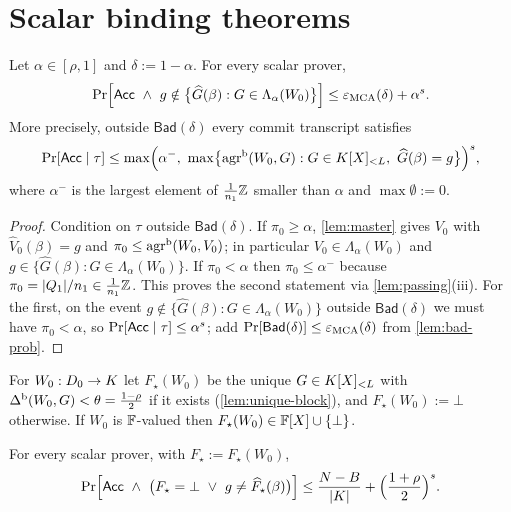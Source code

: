 \section{Scalar binding theorems}

\begin{theorem}\label{thm:scalar-list}
Let $\alpha\in[\rho,1]$ and $\delta:=1-\alpha$. For every scalar prover,
\[
\Pr\Bigl[\Acc\ \wedge\ g\notin\bigl\{\widehat G(\beta):G\in\Lambda_\alpha(W_0)\bigr\}\Bigr]
\le\eps_{\MCA}(\delta)+\alpha^{s}.
\]
More precisely, outside $\mathsf{Bad}(\delta)$ every commit transcript satisfies
\[
\Pr[\Acc\mid\tau]\le\max\Bigl(\alpha^-,\ \max\bigl\{\agr(W_0,G):G\in\K[X]_{<L},\ \widehat G(\beta)=g\bigr\}\Bigr)^{s},
\]
where $\alpha^-$ is the largest element of $\frac1{n_1}\mathbb{Z}$ smaller than $\alpha$ and
$\max\emptyset:=0$.
\end{theorem}

\begin{proof}
Condition on $\tau$ outside $\mathsf{Bad}(\delta)$. If $\pi_0\ge\alpha$, \cref{lem:master}
gives $V_0$ with $\widehat V_0(\beta)=g$ and $\pi_0\le\mathrm{agr}^{\mathrm{b}}(W_0,V_0)$; in particular
$V_0\in\Lambda_\alpha(W_0)$ and $g\in\{\widehat G(\beta):G\in\Lambda_\alpha(W_0)\}$. If
$\pi_0<\alpha$ then $\pi_0\le\alpha^-$ because $\pi_0=|Q_1|/n_1\in\frac1{n_1}\mathbb{Z}$. This
proves the second statement via \cref{lem:passing}(iii). For the first, on the event
$g\notin\{\widehat G(\beta):G\in\Lambda_\alpha(W_0)\}$ outside $\mathsf{Bad}(\delta)$ we
must have $\pi_0<\alpha$, so $\Pr[\mathsf{Acc}\mid\tau]\le\alpha^s$; add
$\Pr[\mathsf{Bad}(\delta)]\le\varepsilon_{\mathrm{MCA}}(\delta)$ from \cref{lem:bad-prob}.
\end{proof}

\begin{definition}\label{def:reference}
For $W_0:D_0\to K$ let $F_\star(W_0)$ be the unique $G\in K[X]_{<L}$ with
$\Delta^{\mathrm{b}}(W_0,G)<\theta=\frac{1-\rho}2$ if it exists (\cref{lem:unique-block}), and
$F_\star(W_0):=\bot$ otherwise. If $W_0$ is $\mathbb{F}$-valued then $F_\star(W_0)\in\mathbb{F}[X]\cup\{\bot\}$.
\end{definition}

\begin{corollary}\label{cor:scalar-unique}
For every scalar prover, with $F_\star:=F_\star(W_0)$,
\[
\Pr\Bigl[\Acc\ \wedge\ \bigl(F_\star=\bot\ \vee\ g\ne\widehat F_\star(\beta)\bigr)\Bigr]
\le\frac{N-B}{|\K|}+\Bigl(\frac{1+\rho}2\Bigr)^{s}.
\]
\end{corollary}

